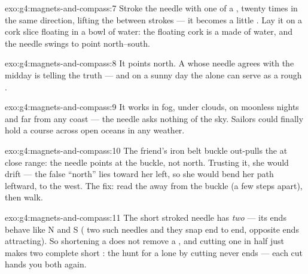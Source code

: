 \begin{solution}{exo:g4:magnets-and-compass:7}
Stroke the needle with one  of a , twenty times in the
same direction, lifting the  between strokes --- it becomes a
little . Lay it on a cork slice floating in a bowl of water:
the floating cork is a  made of water, and the needle swings
to point north--south.
\end{solution}

\begin{solution}{exo:g4:magnets-and-compass:8}
It points north. A  whose needle agrees with the midday
 is telling the truth --- and on a sunny day the  alone
can serve as a rough .
\end{solution}

\begin{solution}{exo:g4:magnets-and-compass:9}
It works in fog, under clouds, on moonless nights and far from any
coast --- the needle asks nothing of the sky. Sailors could finally
hold a course across open oceans in any weather.
\end{solution}

\begin{solution}{exo:g4:magnets-and-compass:10}
The friend's iron belt buckle out-pulls the  at close
range: the needle points at the buckle, not north. Trusting it, she
would drift --- the false ``north'' lies toward her left, so she
would bend her path leftward, to the west. The fix: read the
 away from the buckle (a few steps apart), then walk.
\end{solution}

\begin{solution}{exo:g4:magnets-and-compass:11}
The short stroked needle has \emph{two}  --- its ends behave
like N and S ( two such needles and they snap end to end,
opposite ends attracting). So shortening a  does not remove a
, and cutting one in half just makes two complete short
: the hunt for a lone  by cutting never ends --- each
cut hands you both  again.
\end{solution}
